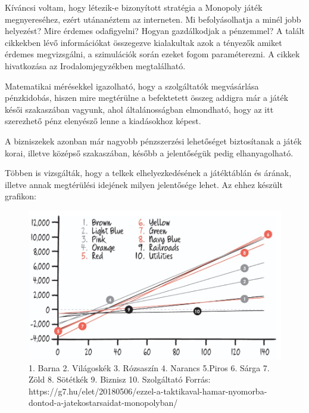 
Kíváncsi voltam, hogy létezik-e bizonyított stratégia a Monopoly játék megnyereséhez, ezért utánanéztem az interneten. Mi befolyásolhatja a minél jobb helyezést? Mire érdemes odafigyelni? Hogyan gazdálkodjak a pénzemmel? A talált cikkekben lévő információkat összegezve kialakultak azok a tényezők amiket érdemes megvizsgálni, a szimulációk során ezeket fogom paraméterezni. A cikkek hivatkozása az Irodalomjegyzékben megtalálható.



Matematikai mérésekkel igazolható, hogy a szolgáltatók megvásárlása pénzkidobás, hiszen mire megtérülne a befektetett összeg addigra már a játék késői szakaszában vagyunk, ahol általánosságban elmondható, hogy az itt szerezhető pénz elenyésző lenne a kiadásokhoz képest.

A bizniszekek azonban már nagyobb pénzszerzési lehetőséget biztosítanak a játék korai, illetve középső szakaszában, később a jelentőségük pedig elhanyagolható.

\newpage
{}

Többen is vizsgálták, hogy a telkek elhelyezkedésének a játéktáblán és árának, illetve annak megtérülési idejének milyen jelentősége lehet. Az ehhez készült grafikon:

\begin{figure}[h!]
\centering
\includegraphics[scale=0.4]{images/monop1.jpg}
\caption{1. Barna 2. Világoskék 3. Rózsaszín 4. Narancs 5.Piros 6. Sárga 7. Zöld 8. Sötétkék 9. Biznisz 10. Szolgáltató
Forrás: https://g7.hu/elet/20180506/ezzel-a-taktikaval-hamar-nyomorba-dontod-a-jatekostarsaidat-monopolyban/}
\label{fig:ff}
\end{figure}

